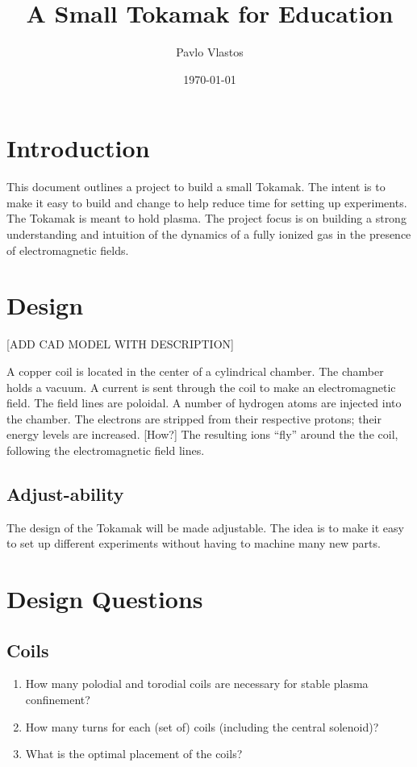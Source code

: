 \documentclass[11pt]{article}
\title{A Small Tokamak for Education}
\author{Pavlo Vlastos}
\date{\today}
\begin{document}
	\maketitle	
	
	
	\section{Introduction}
	\indent This document outlines a project to build a small Tokamak. The intent is to make it easy to build and change to help reduce time for setting up experiments. The Tokamak is meant to hold plasma. The project focus is on building a strong understanding and intuition of the dynamics of a fully ionized gas in the presence of electromagnetic fields.
	
	\section{Design}
	[ADD CAD MODEL WITH DESCRIPTION]
	
	A copper coil is located in the center of a cylindrical chamber. The chamber holds a vacuum. A current is sent through the coil to make an electromagnetic field. The field lines are poloidal. A number of hydrogen atoms are injected into the chamber. The electrons are stripped from their respective protons; their energy levels are increased. [How?] The resulting ions ``fly'' around the the coil, following the electromagnetic field lines. 
	
	\subsection{Adjust-ability}
	The design of the Tokamak will be made adjustable. The idea is to make it easy to set up different experiments without having to machine many new parts.
	
	\section{Design Questions}
	\subsection{Coils}
	\begin{enumerate}
		\item How many polodial and torodial coils are necessary for stable plasma confinement?
		\item How many turns for each (set of) coils (including the central solenoid)?
		\item What is the optimal placement of the coils?
	\end{enumerate}
\end{document}
